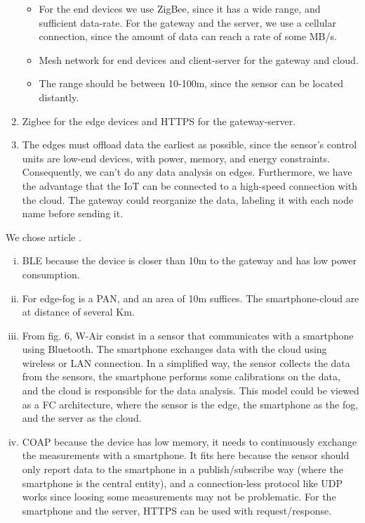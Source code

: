 \documentclass[a4paper, 12pt]{article}
\begin{document}
\begin{exercise}
\begin{enumerate}
	\begin{itemize}
		\item For the end devices we use ZigBee, since it has a wide range, and
			sufficient data-rate. For the gateway and the server, we use a cellular
			connection, since the amount of data can reach a rate of some MB/s.
	    \item Mesh network for end devices and client-server for the gateway and
			cloud.
		\item The range should be between 10-100m, since the sensor can be
			located distantly.
	\end{itemize}
	\item Zigbee for the edge devices and HTTPS for the gateway-server.
    \item The edges must offload data the earliest as possible, since the
		sensor's control units are low-end devices, with power, memory, and
		energy constraints. Consequently, we can't do any data analysis on
		edges. Furthermore, we have the advantage that the IoT can
		be connected to a high-speed connection with the cloud. The gateway could
		reorganize the data, labeling it with each node name before sending it.
\end{enumerate}
\end{exercise}


\begin{exercise}

We chose article \cite{10.1145/3191756}.
\begin{enumerate}[(i)]
\item BLE because the device is closer than 10m to the gateway and has low
	power consumption.
\item For edge-fog is a PAN, and an area of 10m suffices. The
	smartphone-cloud are at distance of several Km.
\item From fig. 6, W-Air consist in a sensor that
	communicates with a smartphone using Bluetooth. The smartphone
	exchanges data with the cloud using wireless or LAN connection. 
	In a simplified way, the sensor collects the data from the sensors, 
	the smartphone performs some calibrations on the data, and the cloud is
	responsible for the data analysis.
	This model 
	could be viewed as a FC architecture, where the sensor is the edge, the
	smartphone as the fog, and the server as the cloud.
\item COAP because the device has low memory, it needs to continuously exchange the
	measurements with a smartphone. It fits here because the sensor should
	only report data to the smartphone in a publish/subscribe way (where the
	smartphone is the central entity), and a connection-less protocol like
	UDP works since loosing some measurements may not be problematic. 
	For the smartphone and the server, HTTPS can be used with
	request/response.
\end{enumerate}
\end{exercise}


\medskip

\printbibliography

\doclicenseThis
\end{document}
